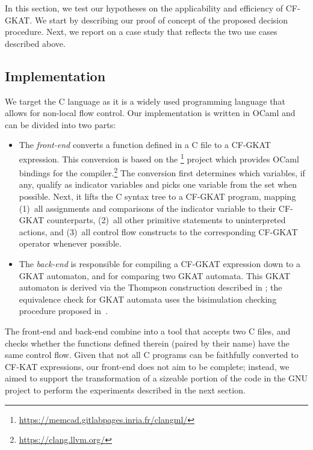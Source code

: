 In this section, we test our hypotheses on the applicability and efficiency of CF-GKAT\@.
We start by describing our proof of concept of the proposed decision procedure.
Next, we report on a case study that reflects the two use cases described above.

\subsection{Implementation}

We target the C language as it is a widely used programming language that allows for non-local flow control.
Our implementation is written in OCaml and can be divided into two parts:
\begin{itemize}
    \item
    The \emph{front-end} converts a function defined in a C file to a CF-GKAT expression.
    This conversion is based on the \footnote{\url{https://memcad.gitlabpages.inria.fr/clangml/}} project which provides OCaml bindings for the  compiler.\footnote{\url{https://clang.llvm.org/}}
    The conversion first determines which variables, if any, qualify as indicator variables and picks one variable from the set when possible.
    Next, it lifts the C syntax tree to a CF-GKAT program, mapping (1)~all assignments and comparisons of the indicator variable to their CF-GKAT counterparts, (2)~all other primitive statements to uninterpreted actions, and (3)~all control flow constructs to the corresponding CF-GKAT operator whenever possible.
    \item
    The \emph{back-end} is responsible for compiling a CF-GKAT expression down to a GKAT automaton, and for comparing two GKAT automata.
    This GKAT automaton is derived via the Thompson construction described in ; the equivalence check for GKAT automata uses the bisimulation checking procedure proposed in~\cite{Smolka_Foster_Hsu_Kappé_Kozen_Silva_2020}.
\end{itemize}

The front-end and back-end combine into a tool that accepts two C files, and checks whether the functions defined therein (paired by their name) have the same control flow.
Given that not all C programs can be faithfully converted to CF-KAT expressions, our front-end does not aim to be complete; instead, we aimed to support the transformation of a sizeable portion of the code in the GNU  project to perform the experiments described in the next section.

